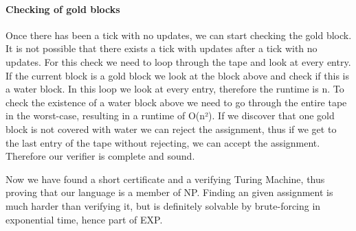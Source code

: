 \paragraph{Checking of gold blocks}
Once there has been a tick with no updates, we can start checking the gold block. It is not possible that there exists a tick with updates after a tick with no updates. For this check we need to loop through the tape and look at every entry. If the current block is a gold block we look at the block above and check if this is a water block. In this loop we look at every entry, therefore the runtime is n. To check the existence of a water block above we need to go through the entire tape in the worst-case, resulting in a runtime of O(n²). If we discover that one gold block is not covered with water we can reject the assignment, thus if we get to the last entry of the tape without rejecting, we can accept the assignment. Therefore our verifier is complete and sound.


Now we have found a short certificate and a verifying Turing Machine, thus proving that our language is a member of NP. Finding an given assignment is much harder than verifying it, but is definitely solvable by brute-forcing in exponential time, hence part of EXP.
